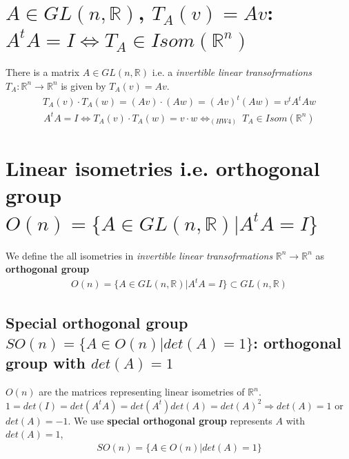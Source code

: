 \documentclass[11pt]{elegantbook}
\begin{document}
\section{$A\in GL(n,\mathbb{R})$, $T_A(v)=Av$: $A^tA=I \Leftrightarrow T_A\in Isom(\mathbb{R}^n)$}
There is a matrix $A\in GL(n,\mathbb{R})$ i.e. a \textit{invertible linear transofrmations} $T_A: \mathbb{R}^n \rightarrow \mathbb{R}^n$ is given by $T_A(v)=Av$.
\begin{equation}
    \begin{aligned}
        T_A(v)\cdot T_A(w)=(Av)\cdot(Aw)=(Av)^t(Aw)=v^tA^tAw
    \end{aligned}
    \nonumber
\end{equation}
\begin{equation}
    \begin{aligned}
        A^tA=I\Leftrightarrow T_A(v)\cdot T_A(w)=v\cdot w\Leftrightarrow_{(HW4)}\ T_A\in Isom(\mathbb{R}^n)
    \end{aligned}
    \nonumber
\end{equation}
\section{ Linear isometries i.e. orthogonal group $O(n)=\{A\in GL(n,\mathbb{R})|A^tA=I \}$}
We define the all isometries in \textit{invertible linear transofrmations} $\mathbb{R}^n \rightarrow \mathbb{R}^n$ as \textbf{orthogonal group}
\begin{equation}
    \begin{aligned}
        O(n)=\{A\in GL(n,\mathbb{R})|A^tA=I \}\subset GL(n,\mathbb{R})
    \end{aligned}
    \nonumber
\end{equation}

\subsection{Special orthogonal group $SO(n)=\{A\in O(n) | det(A)=1\}$: orthogonal group with $det(A)=1$}
$O(n)$ are the matrices representing linear isometries of $\mathbb{R}^n$.
$1=det(I)=det(A^tA)=det(A^t)det(A)=det(A)^2 \Rightarrow	det(A)=1$ or $det(A)=-1$. We use \textbf{special orthogonal group} represents $A$ with $det(A)=1$,
\begin{equation}
    \begin{aligned}
        SO(n)=\{A\in O(n) | det(A)=1\}
    \end{aligned}
    \nonumber
\end{equation}
\end{document}
